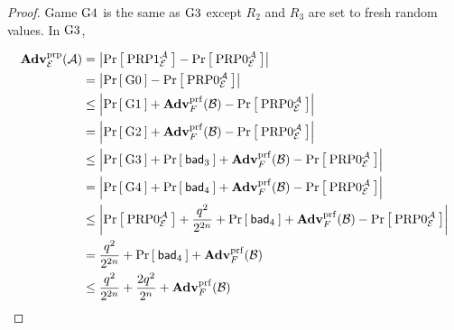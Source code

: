 \begin{proof}
Game $\G4$ is the same as $\G3$ except $R_2$ and $R_3$ are set to fresh random values.
In $\G3$,

\begin{align*}
\AdvPRP{\cipher}{\advA}
    &= \left|\Prob{\PRP1^\advA_\cipher} - \Prob{\PRP0^\advA_\cipher}\right|\\
    &= \left|\Prob{\G0} - \Prob{\PRP0^\advA_\cipher}\right|\\
    &\le \left|\Prob{\G1} + \AdvPRF{F}{\advB} - \Prob{\PRP0^\advA_\cipher}\right|\\
    &=   \left|\Prob{\G2} + \AdvPRF{F}{\advB} - \Prob{\PRP0^\advA_\cipher}\right|\\
    &\le \left|\Prob{\G3} + \Prob{\bad_3} + \AdvPRF{F}{\advB} - \Prob{\PRP0^\advA_\cipher}\right|\\
    &= \left|\Prob{\G4} + \Prob{\bad_4} + \AdvPRF{F}{\advB} - \Prob{\PRP0^\advA_\cipher}\right|\\
    &\le \left|\Prob{\PRP0^\advA_\cipher} + \frac{q^2}{2^{2n}} + \Prob{\bad_4} + \AdvPRF{F}{\advB} - \Prob{\PRP0^\advA_\cipher}\right|\\
    &= \frac{q^2}{2^{2n}} + \Prob{\bad_4} + \AdvPRF{F}{\advB}\\
    &\le \frac{q^2}{2^{2n}} + \frac{2q^2}{2^n} + \AdvPRF{F}{\advB}\\
\end{align*}

\end{proof}


